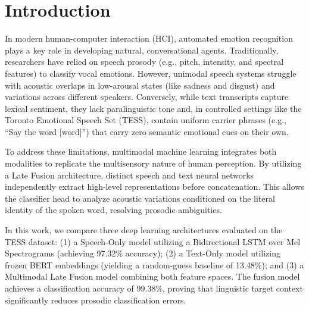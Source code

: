 \documentclass[11pt,journal,onecolumn]{IEEEtran}
\begin{document}
\newpage

\tableofcontents
\newpage

\section{Introduction}


In modern human-computer interaction (HCI), automated emotion recognition plays a key role in developing natural, conversational agents. Traditionally, researchers have relied on speech prosody (e.g., pitch, intensity, and spectral features) to classify vocal emotions. However, unimodal speech systems struggle with acoustic overlaps in low-arousal states (like sadness and disgust) and variations across different speakers. Conversely, while text transcripts capture lexical sentiment, they lack paralinguistic tone and, in controlled settings like the Toronto Emotional Speech Set (TESS), contain uniform carrier phrases (e.g., ``Say the word [word]'') that carry zero semantic emotional cues on their own.

To address these limitations, multimodal machine learning integrates both modalities to replicate the multisensory nature of human perception. By utilizing a Late Fusion architecture, distinct speech and text neural networks independently extract high-level representations before concatenation. This allows the classifier head to analyze acoustic variations conditioned on the literal identity of the spoken word, resolving prosodic ambiguities. 

In this work, we compare three deep learning architectures evaluated on the TESS dataset: (1) a Speech-Only model utilizing a Bidirectional LSTM over Mel Spectrograms (achieving 97.32\% accuracy); (2) a Text-Only model utilizing frozen BERT embeddings (yielding a random-guess baseline of 13.48\%); and (3) a Multimodal Late Fusion model combining both feature spaces. The fusion model achieves a classification accuracy of 99.38\%, proving that linguistic target context significantly reduces prosodic classification errors.
\end{document}
